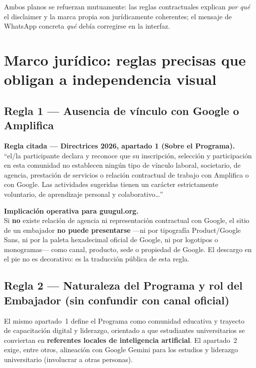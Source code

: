 \documentclass[11pt,a4paper]{article}
\newcommand{\regla}[2]{%
  \begin{reglabox}
  \noindent\textbf{Regla citada --- #1.}\\[0.35em]
  \small #2
  \end{reglabox}
}
\begin{document}
Ambos planos se refuerzan mutuamente: las reglas contractuales explican \emph{por qué} el disclaimer y la marca propia son jurídicamente coherentes; el mensaje de WhatsApp concreta \emph{qué} debía corregirse en la interfaz.

\section{Marco jurídico: reglas precisas que obligan a independencia visual}

\subsection{Regla 1 --- Ausencia de vínculo con Google o Amplifica}

\regla{Directrices 2026, apartado 1 (Sobre el Programa)}{%
\enquote{el/la participante declara y reconoce que su inscripción, selección y participación en esta comunidad no establecen ningún tipo de vínculo laboral, societario, de agencia, prestación de servicios o relación contractual de trabajo con Amplifica o con Google. Las actividades sugeridas tienen un carácter estrictamente voluntario, de aprendizaje personal y colaborativo\ldots}}

\begin{cumplbox}
\noindent\textbf{Implicación operativa para guugul.org.}\\[0.3em]
Si \textbf{no} existe relación de agencia ni representación contractual con Google, el sitio de un embajador \textbf{no puede presentarse} ---ni por tipografía Product/Google Sans, ni por la paleta hexadecimal oficial de Google, ni por logotipos o monogramas--- como canal, producto, sede o propiedad de Google. El descargo en el pie no es decorativo: es la traducción pública de esta regla.
\end{cumplbox}

\subsection{Regla 2 --- Naturaleza del Programa y rol del Embajador (sin confundir con canal oficial)}

El mismo apartado~1 define el Programa como comunidad educativa y trayecto de capacitación digital y liderazgo, orientado a que estudiantes universitarios se conviertan en \textbf{referentes locales de inteligencia artificial}. El apartado~2 exige, entre otros, alineación con Google Gemini para los estudios y liderazgo universitario (involucrar a otras personas).
\end{document}
